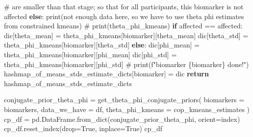 \documentclass[
  letterpaper,
  DIV=11,
  numbers=noendperiod]{scrreprt}
\newenvironment{Shaded}{\begin{snugshade}}{\end{snugshade}}
\newcommand{\BuiltInTok}[1]{\textcolor[rgb]{0.00,0.23,0.31}{#1}}
\newcommand{\CommentTok}[1]{\textcolor[rgb]{0.37,0.37,0.37}{#1}}
\newcommand{\ControlFlowTok}[1]{\textcolor[rgb]{0.00,0.23,0.31}{\textbf{#1}}}
\newcommand{\NormalTok}[1]{\textcolor[rgb]{0.00,0.23,0.31}{#1}}
\newcommand{\OperatorTok}[1]{\textcolor[rgb]{0.37,0.37,0.37}{#1}}
\newcommand{\StringTok}[1]{\textcolor[rgb]{0.13,0.47,0.30}{#1}}
\newcommand{\VariableTok}[1]{\textcolor[rgb]{0.07,0.07,0.07}{#1}}
\begin{document}
\begin{Shaded}
\begin{Highlighting}[]
            \CommentTok{\# are smaller than that stage; so that for all participants, this biomarker is not affected}
            \ControlFlowTok{else}\NormalTok{:}
                \BuiltInTok{print}\NormalTok{(}\StringTok{\textquotesingle{}not enough data here, so we have to use theta phi estimates from constrained kmeans\textquotesingle{}}\NormalTok{)}
                \CommentTok{\# print(theta\_phi\_kmeans)}
                \ControlFlowTok{if}\NormalTok{ affected }\OperatorTok{==} \StringTok{\textquotesingle{}affected\textquotesingle{}}\NormalTok{:}
\NormalTok{                    dic[}\StringTok{\textquotesingle{}theta\_mean\textquotesingle{}}\NormalTok{] }\OperatorTok{=}\NormalTok{ theta\_phi\_kmeans[biomarker][}\StringTok{\textquotesingle{}theta\_mean\textquotesingle{}}\NormalTok{]}
\NormalTok{                    dic[}\StringTok{\textquotesingle{}theta\_std\textquotesingle{}}\NormalTok{] }\OperatorTok{=}\NormalTok{ theta\_phi\_kmeans[biomarker][}\StringTok{\textquotesingle{}theta\_std\textquotesingle{}}\NormalTok{]}
                \ControlFlowTok{else}\NormalTok{:}
\NormalTok{                    dic[}\StringTok{\textquotesingle{}phi\_mean\textquotesingle{}}\NormalTok{] }\OperatorTok{=}\NormalTok{ theta\_phi\_kmeans[biomarker][}\StringTok{\textquotesingle{}phi\_mean\textquotesingle{}}\NormalTok{]}
\NormalTok{                    dic[}\StringTok{\textquotesingle{}phi\_std\textquotesingle{}}\NormalTok{] }\OperatorTok{=}\NormalTok{ theta\_phi\_kmeans[biomarker][}\StringTok{\textquotesingle{}phi\_std\textquotesingle{}}\NormalTok{]}
        \CommentTok{\# print(f"biomarker \{biomarker\} done!")}
\NormalTok{        hashmap\_of\_means\_stds\_estimate\_dicts[biomarker] }\OperatorTok{=}\NormalTok{ dic}
    \ControlFlowTok{return}\NormalTok{ hashmap\_of\_means\_stds\_estimate\_dicts}
\end{Highlighting}
\end{Shaded}

\begin{Shaded}
\begin{Highlighting}[]
\NormalTok{conjugate\_prior\_theta\_phi }\OperatorTok{=}\NormalTok{ get\_theta\_phi\_conjugate\_priors(}
\NormalTok{    biomarkers }\OperatorTok{=}\NormalTok{ biomarkers, }
\NormalTok{    data\_we\_have }\OperatorTok{=}\NormalTok{ df, }
\NormalTok{    theta\_phi\_kmeans }\OperatorTok{=}\NormalTok{ cop\_kmeans\_estimates}
\NormalTok{)}
\NormalTok{cp\_df }\OperatorTok{=}\NormalTok{ pd.DataFrame.from\_dict(conjugate\_prior\_theta\_phi, orient}\OperatorTok{=}\StringTok{\textquotesingle{}index\textquotesingle{}}\NormalTok{)}
\NormalTok{cp\_df.reset\_index(drop}\OperatorTok{=}\VariableTok{True}\NormalTok{, inplace}\OperatorTok{=}\VariableTok{True}\NormalTok{)}
\NormalTok{cp\_df}
\end{Highlighting}
\end{Shaded}
\end{document}

